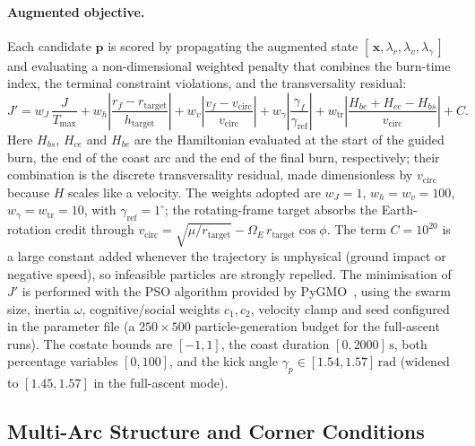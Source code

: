\paragraph{Augmented objective.}
Each candidate $\mathbf{p}$ is scored by propagating the augmented state
$[\,\mathbf{x},\lambda_r,\lambda_v,\lambda_\gamma\,]$ and evaluating a
non-dimensional weighted penalty that combines the burn-time index, the terminal
constraint violations, and the transversality residual:
\begin{equation}
  J' = w_J\,\frac{J}{T_{\max}}
     + w_h\left|\frac{r_f - r_{\text{target}}}{h_{\text{target}}}\right|
     + w_v\left|\frac{v_f - v_{\text{circ}}}{v_{\text{circ}}}\right|
     + w_\gamma\left|\frac{\gamma_f}{\gamma_{\text{ref}}}\right|
     + w_{\text{tr}}\left|\frac{H_{be} + H_{ce} - H_{bs}}{v_{\text{circ}}}\right|
     + C.
  \label{eq:tpbvp_Jprime}
\end{equation}
Here $H_{bs}$, $H_{ce}$ and $H_{be}$ are the Hamiltonian evaluated at the start
of the guided burn, the end of the coast arc and the end of the final burn,
respectively; their combination is the discrete transversality residual, made
dimensionless by $v_{\text{circ}}$ because $H$ scales like a velocity.  The
weights adopted are $w_J = 1$, $w_h = w_v = 100$, $w_\gamma = w_{\text{tr}} = 10$,
with $\gamma_{\text{ref}} = 1^\circ$; the rotating-frame target absorbs the
Earth-rotation credit through
$v_{\text{circ}} = \sqrt{\mu/r_{\text{target}}} - \Omega_E\,r_{\text{target}}\cos\phi$.
The term $C = 10^{20}$ is a large constant added whenever the trajectory is
unphysical (ground impact or negative speed), so infeasible particles are
strongly repelled.  The minimisation of $J'$ is performed with the PSO algorithm
provided by PyGMO~\cite{Pontani2014,Pontani2013}, using the swarm size, inertia
$\omega$, cognitive/social weights $c_1,c_2$, velocity clamp and seed configured
in the parameter file (a $250\times500$ particle-generation budget for the
full-ascent runs).  The costate bounds are $[-1,1]$, the coast duration
$[0,2000]\,\text{s}$, both percentage variables $[0,100]$, and the kick angle
$\gamma_p \in [1.54,1.57]\,\text{rad}$ (widened to $[1.45,1.57]$ in the
full-ascent mode).

\subsection{Multi-Arc Structure and Corner Conditions}
\label{ssec:tpbvp_arcs}

